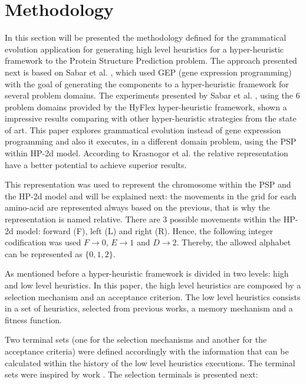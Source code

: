 \documentclass[conference]{IEEEtran}
\begin{document}
\section{Methodology}
\label{sec:methodology}
In this section will be presented the methodology defined for the grammatical evolution application for generating high level heuristics for a hyper-heuristic framework to the Protein Structure Prediction problem. The approach presented next is based on Sabar et al. \cite{sabar2015automatic}, which used GEP (gene expression programming) with the goal of generating the components to a hyper-heuristic framework for several problem domains. The experiments presented by Sabar et al. \cite{sabar2015automatic}, using the 6 problem domains provided by the HyFlex hyper-heuristic framework, shown a impressive results comparing with other hyper-heuristic strategies from the state of art. This paper explores grammatical evolution instead of gene expression programming and also it executes, in a different domain problem, using the PSP within HP-2d model. According to Krasnogor et al. \cite{krasnogor1999protein}  the relative representation have a better potential to achieve superior results. 

This representation was used to represent the chromosome within the PSP and the HP-2d model and will be explained next: the movements in the grid for each amino-acid are represented always based on the previous, that is why the representation is named relative. There are 3 possible movements within the HP-2d model: forward (F), left (L) and right (R). Hence, the following integer codification was used $F\rightarrow0$, $E\rightarrow1$ and $D\rightarrow2$. Thereby, the allowed alphabet can be represented as $\{0,1,2\}$.

As mentioned before a hyper-heuristic framework is divided in two levels: high and low level heuristics. In this paper, the high level heuristics are composed by a selection mechanism and an acceptance criterion. The low level heuristics consists in a set of heuristics, selected from previous works, a memory mechanism and a fitness function. 

Two terminal sets (one for the selection mechanisms and another for the acceptance criteria) were defined accordingly with the information that can be calculated within the history of the low level heuristics executions. The terminal sets were inspired by work \cite{sabar2015automatic}. The selection terminals is presented next:
\end{document}
